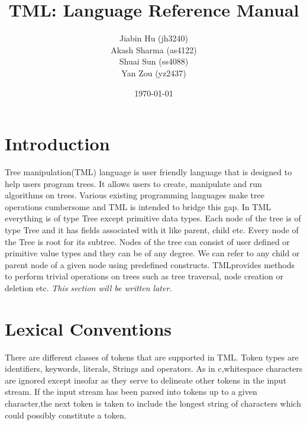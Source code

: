 \documentclass[12pt,psfig,a4]{article}
\begin{document}
 
\pagestyle{plain} 

\newenvironment{code}
{\sffamily
 \setlength{\parskip}{0pt}
 \noindent}
{}

\title{TML: Language Reference Manual}
\author{
Jiabin Hu (jh3240)\\
Akash Sharma (as4122)\\
Shuai Sun (ss4088)\\
Yan Zou (yz2437)
}
\date{\today}
\maketitle





\section{Introduction}

Tree manipulation(TML) language is user friendly language that is designed to help users program trees. It allows users to create, manipulate and run algorithms on trees. Various existing programming languages make tree operations cumbersome and TML is intended to bridge this gap. In TML everything is of type Tree except primitive data types. Each node of the tree is of type Tree and it has fields associated with it like parent, child etc. Every node of the Tree is root for its subtree. Nodes of the tree can consist of user defined or primitive value types and they can be of any degree. We can refer to any child or parent node of a given node using predefined constructs. TMLprovides methods to perform trivial operations on trees such as tree traversal, node creation or deletion etc.
\textit{This section will be written later.}

\section{Lexical Conventions} \label{lexCon}
There are different classes of tokens that are supported in TML. Token types are identifiers, keywords, literals, Strings and operators. As in c,whitespace characters are ignored except insofar as they serve to delineate other tokens in the input stream. If the input stream has been parsed into tokens up to a given character,the next token is taken to include the longest string of characters which could possibly constitute a token.
\end{document}

